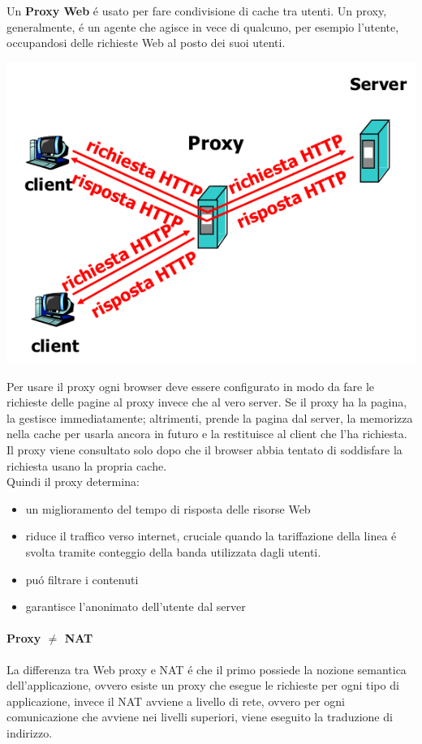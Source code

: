\documentclass[12pt]{article}
\begin{document}
Un \textbf{Proxy Web} \'e usato per fare condivisione di cache tra utenti. Un proxy, generalmente, \'e un agente che agisce in vece 
di qualcuno, per esempio l'utente, occupandosi delle richieste Web al posto dei suoi utenti.

\begin{center}
    \includegraphics[scale=0.5]{applicazione-img9.png}
\end{center}

Per usare il proxy ogni browser deve essere configurato in modo da fare le richieste delle pagine al proxy invece che al vero 
server. Se il proxy ha la pagina, la gestisce immediatamente; altrimenti, prende la pagina dal server, la memorizza nella cache per 
usarla ancora in futuro e la restituisce al client che l'ha richiesta. Il proxy viene consultato solo dopo che il browser abbia 
tentato di soddisfare la richiesta usano la propria cache.\\
Quindi il proxy determina:
\begin{itemize}[noitemsep]
	\item un miglioramento del tempo di risposta delle risorse Web
	\item riduce il traffico verso internet, cruciale quando la tariffazione della linea \'e svolta tramite conteggio della banda 
	      utilizzata dagli utenti.
	\item pu\'o filtrare i contenuti 
	\item garantisce l'anonimato dell'utente dal server
\end{itemize}

\paragraph{Proxy $\neq$ NAT} La differenza tra Web proxy e NAT \'e che il primo possiede la nozione semantica dell'applicazione, 
ovvero esiste un proxy che esegue le richieste per ogni tipo di applicazione, invece il NAT avviene a livello di rete, ovvero per 
ogni comunicazione che avviene nei livelli superiori, viene eseguito la traduzione di indirizzo.
\end{document}
